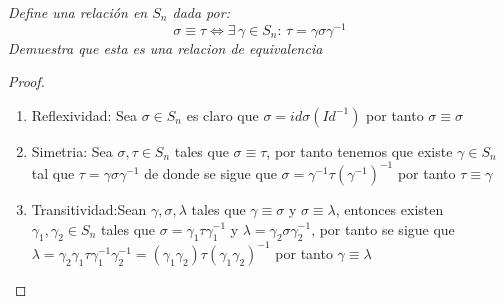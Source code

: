 \documentclass[11pt,letterpaper]{article}
\begin{document}
\begin{tcolorbox}[
	title = \textcolor{black}{\textcolor{white}{Problema 6}},]
\textit{Define una relaci\'on en $S_n$ dada por:
\begin{equation*}
    \sigma\equiv\tau \iff \exists\,\gamma\in S_n:\,\tau=\gamma \sigma \gamma^{-1}
\end{equation*}
Demuestra que esta es una relacion de equivalencia
}
\end{tcolorbox}
\begin{proof}
    \begin{enumerate}
        \item Reflexividad:
        Sea $\sigma\in S_n$ es claro que $\sigma=id\sigma(Id^{-1})$ por tanto $\sigma\equiv\sigma$
        \item Simetria: Sea $\sigma,\tau\in S_n$ tales que $\sigma\equiv\tau$, por tanto tenemos que existe $\gamma\in S_n$ tal que $\tau=\gamma \sigma \gamma^{-1}$ de donde se sigue que $\sigma=\gamma^{-1}\tau(\gamma^{-1})^{-1}$
        por tanto $\tau\equiv \gamma$
        \item Transitividad:Sean $\gamma,\sigma,\lambda$ tales que $\gamma\equiv\sigma$ y $\sigma\equiv\lambda$, entonces existen $\gamma_1,\gamma_2\in S_n$ tales que $\sigma=\gamma_1\tau \gamma_1^{-1}$ y $\lambda=\gamma_2\sigma\gamma_2^{-1}$, por tanto se sigue que
        $\lambda=\gamma_2\gamma_1\tau\gamma_1^{-1}\gamma_2^{-1}=(\gamma_1\gamma_2)\tau(\gamma_1\gamma_2)^{-1}$ por tanto $\gamma\equiv\lambda$
    \end{enumerate}
\end{proof}
\end{document}
